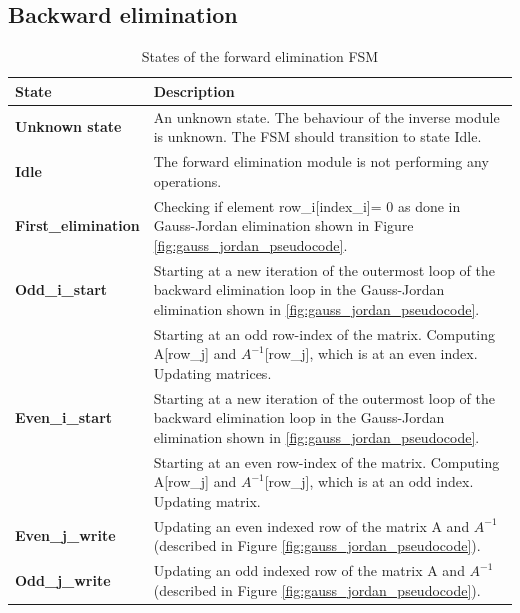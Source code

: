 \subsection{Backward elimination}

\begin{table}[H]
\centering
 \resizebox{1\textwidth}{!}
{\begin{tabular}{l|l}
State                                                                                    & Description                                                                                   \\
\hline
\textbf{Unknown state}                                                                   & An unknown state. The behaviour of the inverse module is unknown. The FSM should transition to state Idle.                                    \\
\textbf{Idle}                                                                            & The forward elimination module is not performing any operations.                                          \\
\textbf{First\_elimination} & Checking if element row\_i[index\_i]= 0 as done in Gauss-Jordan elimination shown in Figure \ref{fig:gauss_jordan_pseudocode}.     \\
\textbf{Odd\_i\_start}                                                            & Starting at a new iteration of the outermost loop of the backward elimination loop in the Gauss-Jordan elimination shown in  \ref{fig:gauss_jordan_pseudocode}. 
\\
&
Starting at an odd row-index of the matrix. Computing A[row\_j] and $A^{-1}$[row\_j], which is at an even index. Updating matrices.       \\

\textbf{Even\_i\_start}                                                            & Starting at a new iteration of the outermost loop of the backward elimination loop in the Gauss-Jordan elimination shown in  \ref{fig:gauss_jordan_pseudocode}.
\\&
Starting at an even row-index of the matrix. Computing A[row\_j] and $A^{-1}$[row\_j], which is at an odd index. Updating matrix.        \\

\textbf{Even\_j\_write}                                                           & Updating an even indexed row of the matrix A and $A^{-1}$(described in Figure \ref{fig:gauss_jordan_pseudocode}).       \\
\textbf{Odd\_j\_write}                                                                  & Updating an odd indexed row of the matrix A and $A^{-1}$(described in Figure \ref{fig:gauss_jordan_pseudocode}).   
\end{tabular}}
\caption{States of the forward elimination FSM}
\label{tab:fsm_forward_elimination}

\end{table}

